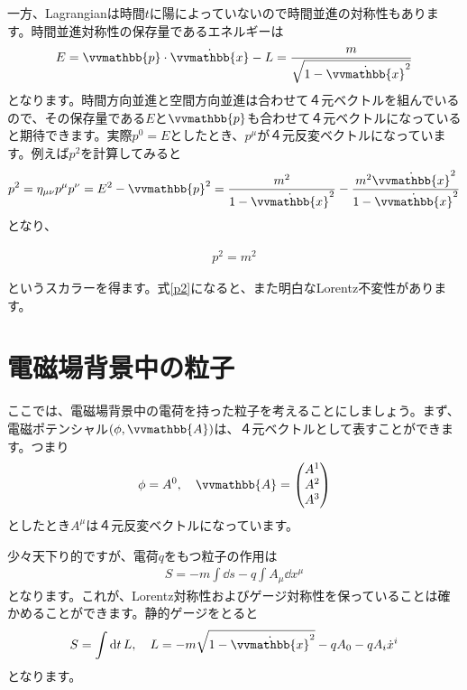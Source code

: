 \documentclass[report,paper=a4, fontsize=12pt, line_length=16cm, number_of_lines=33,dvipdfmx]{jlreq}
\newenvironment{important}{\begin{tcolorbox}[
  colback = white,
  colframe = red!35,
  boxrule = 2mm,
  fonttitle = \bfseries,
  after = \noindent] }{\end{tcolorbox}}
\numberwithin{equation}{chapter}
\newcommand{\xb}{\vvmathbb{x}}
\newcommand{\pbb}{\vvmathbb{p}}
\newcommand{\Ab}{\vvmathbb{A}}
\begin{document}
一方、Lagrangianは時間$t$に陽によっていないので時間並進の対称性もあります。時間並進対称性の保存量であるエネルギーは
\begin{align}
  E=\pbb\cdot \dot{\xb}-L=\frac{m}{\sqrt{1-\dot{\xb}^2}}
\end{align}
となります。時間方向並進と空間方向並進は合わせて４元ベクトルを組んでいるので、その保存量である$E$と$\pbb$も合わせて４元ベクトルになっていると期待できます。実際$p^0=E$としたとき、$p^{\mu}$が４元反変ベクトルになっています。例えば$p^2$を計算してみると
\begin{align}
  p^2=\eta_{\mu\nu}p^{\mu}p^{\nu}=E^2-\pbb^2
=\frac{m^2}{1-\dot{\xb}^2}-\frac{m^2\dot{\xb}^2}{1-\dot{\xb}^2}
\end{align}
となり、
\begin{important}
  \begin{align}
    p^2=m^2\label{p2}
  \end{align}  
\end{important}
というスカラーを得ます。式\eqref{p2}になると、また明白なLorentz不変性があります。

\section{電磁場背景中の粒子}
\label{classicalelemagbackground}
ここでは、電磁場背景中の電荷を持った粒子を考えることにしましょう。まず、電磁ポテンシャル$(\phi, \Ab)$は、４元ベクトルとして表すことができます。つまり
\begin{align}
  \phi=A^0,\quad \Ab=\mqty(A^1 \\ A^2 \\ A^3)
\end{align}
としたとき$A^{\mu}$は４元反変ベクトルになっています。

少々天下り的ですが、電荷$q$をもつ粒子の作用は
\begin{align}
  S=-m\int \dd{s}-q\int A_{\mu}\dd{x}^{\mu}
\end{align}
となります。これが、Lorentz対称性およびゲージ対称性を保っていることは確かめることができます。静的ゲージをとると
\begin{align}
  S=\int \dd{t}L,\quad
  L=-m\sqrt{1-\dot{\xb}^2}-qA_{0}-qA_{i}\dot{x}^{i}
  \label{emstaticgauge}
\end{align}
となります。
\end{document}
